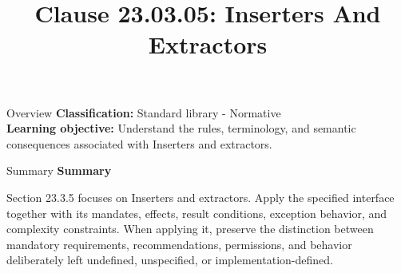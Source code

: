 \documentclass[10pt,letterpaper]{article}
\title{Clause 23.03.05: Inserters And Extractors}
\author{}
\date{}
\begin{document}
\maketitle
\begin{CornellOverviewBox}{Overview}
\textbf{Classification:} Standard library - Normative\\[2pt]
\textbf{Learning objective:} Understand the rules, terminology, and semantic consequences associated with Inserters and extractors.
\end{CornellOverviewBox}\begin{CornellSummaryBox}{Summary}
{\sffamily\bfseries\color{Accent} Summary}\par\vspace{3pt}Section 23.3.5 focuses on Inserters and extractors. Apply the specified interface together with its mandates, effects, result conditions, exception behavior, and complexity constraints. When applying it, preserve the distinction between mandatory requirements, recommendations, permissions, and behavior deliberately left undefined, unspecified, or implementation-defined.
\end{CornellSummaryBox}
\end{document}

